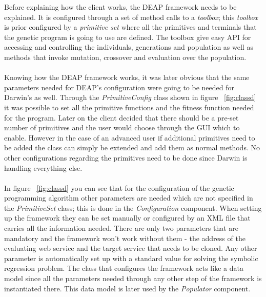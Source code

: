 Before explaining how the client works, the DEAP framework needs to be explained. It is configured through a set of method calls
to a \textit{toolbox}; this \textit{toolbox} is prior configured by a \textit{primitive set} where all the primitives and 
terminals that the genetic program is going to use are defined. The toolbox give easy API for accessing and controlling the individuals,
generations and population as well as methods that invoke mutation, crossover and evaluation over the population.
\paragraph{}
Knowing how the DEAP framework works, it was later obvious that the same parameters needed for DEAP's configuration
were going to be needed for Darwin's as well. Through the \textit{PrimitiveConfig} class shown in figure ~\ref{fig:classd}
it was possible to set all the primitive functions and the fitness function needed for the program. Later on the client decided
that there should be a pre-set number of primitives and the user would choose through the GUI which to enable. However in
the case of an advanced user if additional primitives need to be added the class can simply be extended and add them as
normal methods. No other configurations regarding the primitives need to be done since Darwin is handling everything else.

\paragraph{}
In figure ~\ref{fig:classd} you can see that for the configuration of the genetic programming algorithm other parameters are needed which
are not specified in the \textit{PrimitiveSet} class; this is done in the \textit{Configuration} component. When setting up the framework they can be set manually or configured
by an XML file that carries all the information needed. There are only two parameters that are mandatory and the framework
won't work without them - the address of the evaluating web service and the target service that needs to be cloned. Any other
parameter is automatically set up with a standard value for solving the symbolic regression problem. The class that configures
the framework acts like a data model since all the parameters needed through any other step of the framework is instantiated there.
This data model is later used by the \textit{Populator} component.
